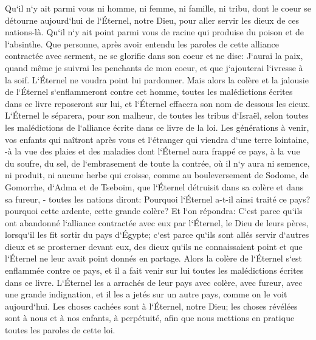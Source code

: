 \verse Qu`il n`y ait parmi vous ni homme, ni femme, ni famille, ni tribu, dont le coeur se détourne aujourd`hui de l`Éternel, notre Dieu, pour aller servir les dieux de ces nations-là. Qu`il n`y ait point parmi vous de racine qui produise du poison et de l`absinthe. 
\verse Que personne, après avoir entendu les paroles de cette alliance contractée avec serment, ne se glorifie dans son coeur et ne dise: J`aurai la paix, quand même je suivrai les penchants de mon coeur, et que j`ajouterai l`ivresse à la soif. 
\verse L`Éternel ne voudra point lui pardonner. Mais alors la colère et la jalousie de l`Éternel s`enflammeront contre cet homme, toutes les malédictions écrites dans ce livre reposeront sur lui, et l`Éternel effacera son nom de dessous les cieux. 
\verse L`Éternel le séparera, pour son malheur, de toutes les tribus d`Israël, selon toutes les malédictions de l`alliance écrite dans ce livre de la loi. 
\verse Les générations à venir, vos enfants qui naîtront après vous et l`étranger qui viendra d`une terre lointaine, -à la vue des plaies et des maladies dont l`Éternel aura frappé ce pays, à la vue du soufre, du sel, 
\verse de l`embrasement de toute la contrée, où il n`y aura ni semence, ni produit, ni aucune herbe qui croisse, comme au bouleversement de Sodome, de Gomorrhe, d`Adma et de Tseboïm, que l`Éternel détruisit dans sa colère et dans sa fureur, - 
\verse toutes les nations diront: Pourquoi l`Éternel a-t-il ainsi traité ce pays? pourquoi cette ardente, cette grande colère? 
\verse Et l`on répondra: C`est parce qu`ils ont abandonné l`alliance contractée avec eux par l`Éternel, le Dieu de leurs pères, lorsqu`il les fit sortir du pays d`Égypte; 
\verse c`est parce qu`ils sont allés servir d`autres dieux et se prosterner devant eux, des dieux qu`ils ne connaissaient point et que l`Éternel ne leur avait point donnés en partage. 
\verse Alors la colère de l`Éternel s`est enflammée contre ce pays, et il a fait venir sur lui toutes les malédictions écrites dans ce livre. 
\verse L`Éternel les a arrachés de leur pays avec colère, avec fureur, avec une grande indignation, et il les a jetés sur un autre pays, comme on le voit aujourd`hui. 
\verse Les choses cachées sont à l`Éternel, notre Dieu; les choses révélées sont à nous et à nos enfants, à perpétuité, afin que nous mettions en pratique toutes les paroles de cette loi. 

